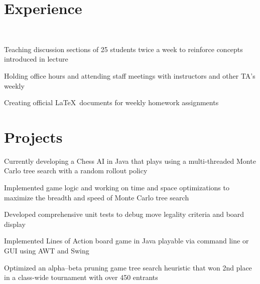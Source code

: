 \documentclass[]{deedy-resume-openfont}
\begin{document}
\begin{minipage}[t]{0.66\textwidth} 


\section{Experience}

 \\
\vspace{\topsep} %
\begin{tightemize}
\item Teaching discussion sections of 25 students twice a week to reinforce concepts introduced in lecture
\item Holding office hours and attending staff meetings with instructors and other TA’s weekly
\item  Creating official \LaTeX \ documents for weekly homework assignments
\end{tightemize}
\sectionsep


\section{Projects}
\begin{tightemize}
\item Currently developing a Chess AI in Java that plays using a multi-threaded Monte Carlo tree search with a random rollout policy
\item Implemented game logic and working on time and space optimizations to maximize the breadth and speed of Monte Carlo tree search
\item Developed comprehensive unit tests to debug move legality criteria and board display
\end{tightemize}
\sectionsep

\begin{tightemize}
\item Implemented Lines of Action board game in Java playable via command line or GUI using AWT and Swing
\item Optimized an alpha–beta pruning game tree search heuristic that won 2nd place in a class-wide tournament with over 450 entrants
\end{tightemize}
\sectionsep


\end{minipage}
\end{document}
